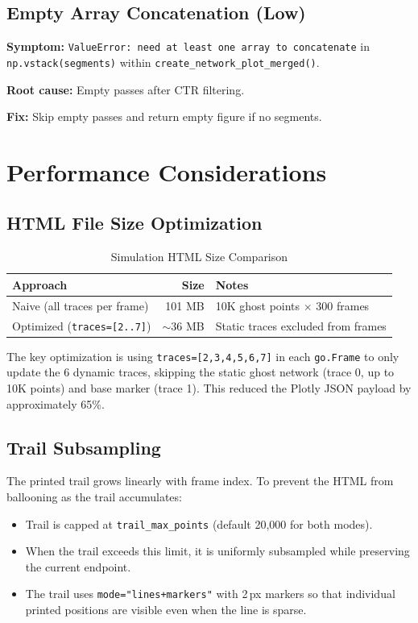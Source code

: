\documentclass[11pt,a4paper]{article}
\newcommand{\funcname}[1]{\texttt{\textcolor{codepurple}{#1}}}
\begin{document}
\subsection{Empty Array Concatenation (Low)}

\textbf{Symptom:} \texttt{ValueError: need at least one array to concatenate} in \texttt{np.vstack(segments)} within \funcname{create\_network\_plot\_merged()}.

\textbf{Root cause:} Empty passes after CTR filtering.

\textbf{Fix:} Skip empty passes and return empty figure if no segments.

\section{Performance Considerations}
\label{sec:performance}

\subsection{HTML File Size Optimization}

\begin{table}[H]
\centering
\caption{Simulation HTML Size Comparison}
\begin{tabular}{lrl}
\toprule
\textbf{Approach} & \textbf{Size} & \textbf{Notes} \\
\midrule
Naive (all traces per frame) & 101 MB & 10K ghost points $\times$ 300 frames \\
Optimized (\texttt{traces=[2..7]}) & $\sim$36 MB & Static traces excluded from frames \\
\bottomrule
\end{tabular}
\end{table}

\noindent The key optimization is using \texttt{traces=[2,3,4,5,6,7]} in each \texttt{go.Frame} to only update the 6 dynamic traces, skipping the static ghost network (trace 0, up to 10K points) and base marker (trace 1). This reduced the Plotly JSON payload by approximately 65\%.

\subsection{Trail Subsampling}

The printed trail grows linearly with frame index. To prevent the HTML from ballooning as the trail accumulates:
\begin{itemize}[nosep]
    \item Trail is capped at \texttt{trail\_max\_points} (default 20,000 for both modes).
    \item When the trail exceeds this limit, it is uniformly subsampled while preserving the current endpoint.
    \item The trail uses \texttt{mode="lines+markers"} with 2\,px markers so that individual printed positions are visible even when the line is sparse.
\end{itemize}
\end{document}
